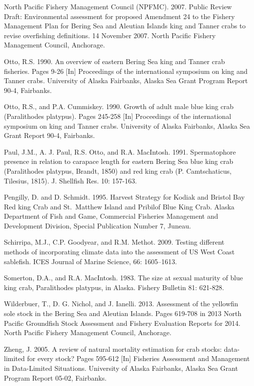 \documentclass[]{article}
\begin{document}
North Pacific Fishery Management Council (NPFMC). 2007. Public Review
Draft: Environmental assessment for proposed Amendment 24 to the Fishery
Management Plan for Bering Sea and Aleutian Islands king and Tanner
crabs to revise overfishing definitions. 14 November 2007. North Pacific
Fishery Management Council, Anchorage.

Otto, R.S. 1990. An overview of eastern Bering Sea king and Tanner crab
fisheries. Pages 9-26 {[}In{]} Proceedings of the international
symposium on king and Tanner crabs. University of Alaska Fairbanks,
Alaska Sea Grant Program Report 90-4, Fairbanks.

Otto, R.S., and P.A. Cummiskey. 1990. Growth of adult male blue king
crab (Paralithodes platypus). Pages 245-258 {[}In{]} Proceedings of the
international symposium on king and Tanner crabs. University of Alaska
Fairbanks, Alaska Sea Grant Report 90-4, Fairbanks.

Paul, J.M., A. J. Paul, R.S. Otto, and R.A. MacIntosh. 1991.
Spermatophore presence in relation to carapace length for eastern Bering
Sea blue king crab (Paralithodes platypus, Brandt, 1850) and red king
crab (P. Camtschaticus, Tilesius, 1815). J. Shellfish Res. 10: 157-163.

Pengilly, D. and D. Schmidt. 1995. Harvest Strategy for Kodiak and
Bristol Bay Red king Crab and St.~Matthew Island and Pribilof Blue King
Crab. Alaska Department of Fish and Game, Commercial Fisheries
Management and Development Division, Special Publication Number 7,
Juneau.

Schirripa, M.J., C.P. Goodyear, and R.M. Methot. 2009. Testing different
methods of incorporating climate data into the assessment of US West
Coast sablefish. ICES Journal of Marine Science, 66: 1605--1613.

Somerton, D.A., and R.A. MacIntosh. 1983. The size at sexual maturity of
blue king crab, Paralithodes platypus, in Alaska. Fishery Bulletin 81:
621-828.

Wilderbuer, T., D. G. Nichol, and J. Ianelli. 2013. Assessment of the
yellowfin sole stock in the Bering Sea and Aleutian Islands. Pages
619-708 in 2013 North Pacific Groundfish Stock Assessment and Fishery
Evaluation Reports for 2014. North Pacific Fishery Management Council,
Anchorage.

Zheng, J. 2005. A review of natural mortality estimation for crab
stocks: data-limited for every stock? Pages 595-612 {[}In{]} Fisheries
Assessment and Management in Data-Limited Situations. University of
Alaska Fairbanks, Alaska Sea Grant Program Report 05-02, Fairbanks.
\end{document}
